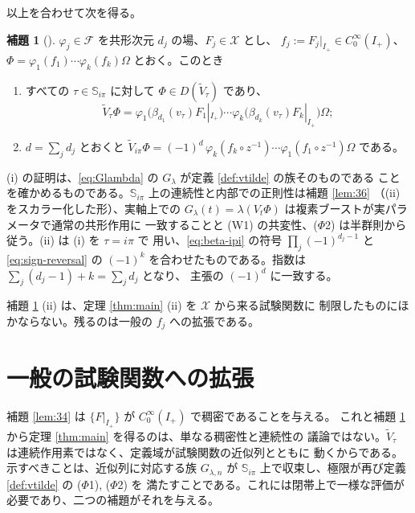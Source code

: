 \documentclass[11pt,a4paper]{article}
\newcommand{\Fields}{\mathcal{F}}
\newcommand{\Xcl}{\mathcal{X}}
\newcommand{\Strip}{\mathbb{S}}
\newcommand{\Vt}{\widetilde{V}}
\newcommand{\Dom}{D}
\theoremstyle{definition}
\newtheorem{lemma}[theorem]{補題}
\newcommand{\srcnum}[1]{\renewcommand{\thetheorem}{#1}}
\begin{document}
以上を合わせて次を得る。

\srcnum{3.7}
\begin{lemma}[\cite{T26}]
\label{lem:37}
$\varphi_j \in \Fields$ を共形次元 $d_j$ の場、$F_j \in \Xcl$ とし、
$f_j := F_j|_{I_+} \in C_0^\infty(I_+)$、$\Phi = \varphi_1(f_1)\cdots\varphi_k(f_k)\Omega$
とおく。このとき
\begin{enumerate}
  \item[(i)] すべての $\tau \in \Strip_{i\pi}$ に対して $\Phi \in \Dom(\Vt_\tau)$ であり、
    \[
      \Vt_\tau \Phi = \varphi_1\bigl(\beta_{d_1}(v_\tau)F_1|_{I_+}\bigr)
        \cdots \varphi_k\bigl(\beta_{d_k}(v_\tau)F_k|_{I_+}\bigr)\Omega ;
    \]
  \item[(ii)] $d = \sum_j d_j$ とおくと
    $\Vt_{i\pi}\Phi = (-1)^{d}\, \varphi_k(f_k \circ z^{-1})\cdots\varphi_1(f_1 \circ z^{-1})\Omega$
    である。
\end{enumerate}
\end{lemma}

(i) の証明は、\eqref{eq:Glambda} の $G_\lambda$ が定義 \ref{def:vtilde} の族そのものである
ことを確かめるものである。$\Strip_{i\pi}$ 上の連続性と内部での正則性は補題 \ref{lem:36}
（(ii) をスカラー化した形）、実軸上での $G_\lambda(t) = \lambda(V_t\Phi)$ は複素ブーストが実パラメータで通常の共形作用に
一致することと (W1) の共変性、($\Phi$2) は半群則から従う。(ii) は (i) を $\tau = i\pi$ で
用い、\eqref{eq:beta-ipi} の符号 $\prod_j (-1)^{d_j-1}$ と \eqref{eq:sign-reversal} の
$(-1)^k$ を合わせたものである。指数は $\sum_j (d_j - 1) + k = \sum_j d_j$ となり、
主張の $(-1)^d$ に一致する。

補題 \ref{lem:37} (ii) は、定理 \ref{thm:main} (ii) を $\Xcl$ から来る試験関数に
制限したものにほかならない。残るのは一般の $f_j$ への拡張である。

\section{一般の試験関数への拡張}
\label{sec:general}

補題 \ref{lem:34} は $\{F|_{I_+}\}$ が $C_0^\infty(I_+)$ で稠密であることを与える。
これと補題 \ref{lem:37} から定理 \ref{thm:main} を得るのは、単なる稠密性と連続性の
議論ではない。$\Vt_\tau$ は連続作用素ではなく、定義域が試験関数の近似列とともに
動くからである。示すべきことは、近似列に対応する族 $G_{\lambda,n}$ が
$\Strip_{i\pi}$ 上で収束し、極限が再び定義 \ref{def:vtilde} の ($\Phi$1), ($\Phi$2) を
満たすことである。これには閉帯上で一様な評価が必要であり、二つの補題がそれを与える。
\end{document}
